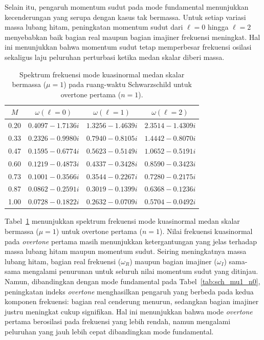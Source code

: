 Selain itu, pengaruh momentum sudut pada mode fundamental menunjukkan kecenderungan yang
serupa dengan kasus tak bermassa. Untuk setiap variasi massa lubang hitam, peningkatan
momentum sudut dari $\ell=0$ hingga $\ell=2$ menyebabkan baik bagian real maupun bagian
imajiner frekuensi meningkat. Hal ini menunjukkan bahwa momentum sudut tetap memperbesar frekuensi osilasi
sekaligus laju peluruhan perturbasi ketika medan skalar diberi massa.

\begin{table}[H]
\centering
\caption{Spektrum frekuensi mode kuasinormal medan skalar bermassa ($\mu=1$) pada ruang-waktu Schwarzschild untuk overtone pertama ($n=1$).}
\vspace{0.2cm}
\renewcommand{\arraystretch}{1.25}
\begin{tabular}{cccc}
\toprule
$M$ & $\omega(\ell=0)$ & $\omega(\ell=1)$ & $\omega(\ell=2)$ \\
\midrule
0.20 & $0.4097 - 1.7136i$ & $1.3256 - 1.4639i$ & $2.3514 - 1.4309i$ \\
0.33 & $0.2326 - 0.9980i$ & $0.7940 - 0.8105i$ & $1.4442 - 0.8070i$ \\
0.47 & $0.1595 - 0.6774i$ & $0.5623 - 0.5149i$ & $1.0652 - 0.5191i$ \\
0.60 & $0.1219 - 0.4873i$ & $0.4337 - 0.3428i$ & $0.8590 - 0.3423i$ \\
0.73 & $0.1001 - 0.3566i$ & $0.3544 - 0.2267i$ & $0.7280 - 0.2175i$ \\
0.87 & $0.0862 - 0.2591i$ & $0.3019 - 0.1399i$ & $0.6368 - 0.1236i$ \\
1.00 & $0.0728 - 0.1822i$ & $0.2632 - 0.0709i$ & $0.5704 - 0.0492i$ \\
\bottomrule
\end{tabular}
\label{tab:sch_mu1_n1}
\end{table}

Tabel~\ref{tab:sch_mu1_n1} menunjukkan spektrum frekuensi mode kuasinormal medan skalar bermassa ($\mu=1$) untuk overtone pertama ($n=1$). Nilai frekuensi kuasinormal pada \textit{overtone} pertama masih menunjukkan ketergantungan yang jelas terhadap massa lubang hitam maupun momentum sudut. Seiring meningkatnya massa lubang hitam, bagian real frekuensi ($\omega_R$) maupun bagian imajiner ($\omega_I$) sama-sama mengalami penurunan untuk seluruh nilai momentum sudut yang ditinjau. Namun, dibandingkan dengan mode fundamental pada Tabel~\ref{tab:sch_mu1_n0}, peningkatan indeks \textit{overtone} menghasilkan pengaruh yang berbeda pada kedua komponen frekuensi: bagian real cenderung menurun, sedangkan bagian imajiner justru meningkat cukup signifikan. Hal ini menunjukkan bahwa mode \textit{overtone} pertama berosilasi pada frekuensi yang lebih rendah, namun mengalami peluruhan yang jauh lebih cepat dibandingkan mode fundamental.

